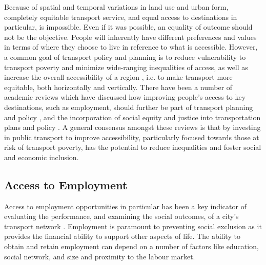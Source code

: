\documentclass[11 pt, letterpaper]{article}
\begin{document}
{Because of spatial and temporal variations in land use and urban form, completely equitable transport service, and equal access to destinations in particular, is impossible. Even if it was possible, an equality of outcome should not be the objective. People will inherently have different preferences and values in terms of where they choose to live in reference to what is accessible. However, a common goal of transport policy and planning is to reduce vulnerability to transport poverty and minimize wide-ranging inequalities of access, as well as increase the overall accessibility of a region \cite{seu2003,martens2012justice}, i.e. to make transport more equitable, both horizontally and vertically. There have been a number of academic reviews which have discussed how improving people’s access to key destinations, such as employment, should further be part of transport planning and policy , and the incorporation of social equity and justice into transportation plans and policy . A general consensus amongst these reviews is that by investing in public transport to improve accessibility, particularly focused towards those at risk of transport poverty, has the potential to reduce inequalities and foster social and economic inclusion.




\subsection{Access to Employment}

Access to employment opportunities in particular has been a key indicator of evaluating the performance, and examining the social outcomes, of a city's transport network \cite{shen1998,bania2008}. Employment is paramount to preventing social exclusion as it provides the financial ability to support other aspects of life. The ability to obtain and retain employment can depend on a number of factors like education, social network, and size and proximity to the labour market.

}
\end{document}
